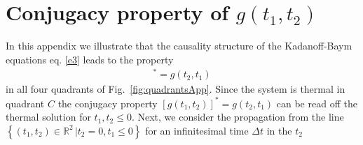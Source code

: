 \documentclass[prx,aps,onecolumn,amsfonts,showpacs,superscriptaddress,preprint,eqsecnum]
{revtex4-1}
\newcommand{\beq}{\begin{equation}}
\newcommand{\eeq}{\end{equation}}
\newcommand{\nn}{\nonumber \\}
\begin{document}
\section{Conjugacy property of $g(t_1,t_2)$ \label{App:ConProperty}}
In this appendix we illustrate that the causality structure of the Kadanoff-Baym equations eq. \eqref{e3}  leads to  the property 
\begin{align}
[g(t_1,t_2)]^{\ast} = g(t_2,t_1) 
\end{align}
in all four quadrants of Fig.~\ref{fig:quadrantsApp}. Since the system is thermal in quadrant $C$
the conjugacy property $[g(t_1,t_2)]^{\ast} = g(t_2,t_1)$ can be read off the thermal solution for $t_1,t_2\leq0$.
Next, we consider the propagation from the line $\left\{(t_1,t_2)\in \mathbb{R}^2 \,| t_2 = 0, t_1\leq 0 \right\}$ for an infinitesimal time $\Delta t$ in the $t_2$  
\end{document}
